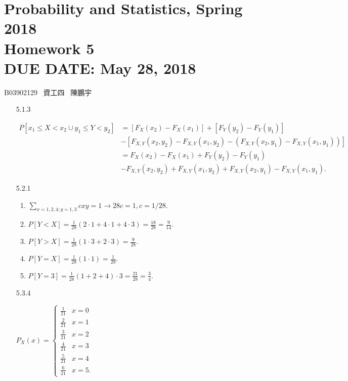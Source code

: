 \documentclass{article}
\newcommand{\hmwkClass}{Probability and Statistics, Spring 2018}
\newcommand{\hmwkTitle}{Homework 5}
\newcommand{\hmwkDueDate}{May 28, 2018}
\begin{document}
\thispagestyle{empty}
\section*{\hmwkClass \\
    \normalsize{\hmwkTitle} \\
    \normalsize{DUE DATE: \hmwkDueDate}
}

\hfill{B03902129 \, 資工四 \, 陳鵬宇}

\begin{enumerate}
    \item [5.1.3] 
    
    \begin{align*}
    P[x_1 \le X < x_2 \cup y_1 \le Y < y_2] 
        & = [F_X(x_2) - F_X(x_1)] + [F_Y(y_2) - F_Y(y_1)] \\
        & - [F_{X, Y}(x_2, y_2) - F_{X, Y}(x_1, y_2) - (F_{X, Y}(x_2, y_1) - F_{X, Y}(x_1, y_1))] \\
        & = F_X(x_2) - F_X(x_1) + F_Y(y_2) - F_Y(y_1) \\
        & - F_{X, Y}(x_2, y_2) + F_{X, Y}(x_1, y_2) + F_{X, Y}(x_2, y_1) - F_{X, Y}(x_1, y_1).
    \end{align*}

    \item [5.2.1]

    \begin{enumerate}[label=(\alph*)]
        \item $\sum\limits_{x = 1, 2, 4; y = 1, 3} cxy = 1 \to 28c = 1, c = 1 / 28$.
        \item $P[Y < X] = \frac{1}{28}(2 \cdot 1 + 4 \cdot 1 + 4 \cdot 3) = \frac{18}{28} = \frac{9}{14}$.
        \item $P[Y > X] = \frac{1}{28}(1 \cdot 3 + 2 \cdot 3) = \frac{9}{28}$.
        \item $P[Y = X] = \frac{1}{28}(1 \cdot 1) = \frac{1}{28}$.
        \item $P[Y = 3] = \frac{1}{28}(1 + 2 + 4) \cdot 3 = \frac{21}{28} = \frac{3}{4}$.
    \end{enumerate}

    \item [5.3.4]

    $P_X(x) = \begin{cases}
        \frac{1}{21} & x = 0 \\
        \frac{2}{21} & x = 1 \\
        \frac{3}{21} & x = 2 \\
        \frac{4}{21} & x = 3 \\
        \frac{5}{21} & x = 4 \\
        \frac{6}{21} & x = 5.
    \end{cases}
    $


\end{enumerate}
\end{document}
